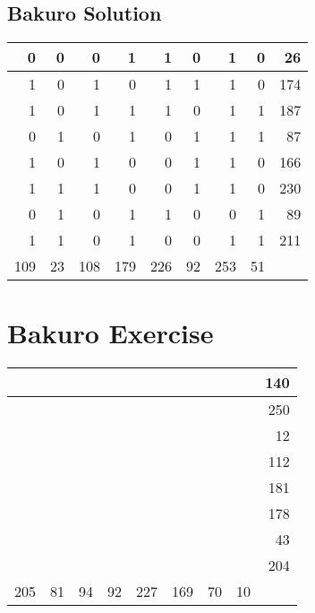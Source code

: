 \documentclass[]{article}
\begin{document}
 \subsection{Bakuro Solution} 
\begin{tabular}{rrrrrrrrr}
\hline
   0 &  0 &   0 &   1 &   1 &  0 &   1 &  0 &  26 \\ \hline
   1 &  0 &   1 &   0 &   1 &  1 &   1 &  0 & 174 \\ \hline
   1 &  0 &   1 &   1 &   1 &  0 &   1 &  1 & 187 \\ \hline
   0 &  1 &   0 &   1 &   0 &  1 &   1 &  1 &  87 \\ \hline
   1 &  0 &   1 &   0 &   0 &  1 &   1 &  0 & 166 \\ \hline
   1 &  1 &   1 &   0 &   0 &  1 &   1 &  0 & 230 \\ \hline
   0 &  1 &   0 &   1 &   1 &  0 &   0 &  1 &  89 \\ \hline
   1 &  1 &   0 &   1 &   0 &  0 &   1 &  1 & 211 \\ \hline
 109 & 23 & 108 & 179 & 226 & 92 & 253 & 51 &     \\ \hline
\hline
\end{tabular}\newpage\section{Bakuro Exercise}\begin{tabular}{rrrrrrrrr}
\hline
     &    &    &    &     &     &    &    & 140 \\ \hline
     &    &    &    &     &     &    &    & 250 \\ \hline
     &    &    &    &     &     &    &    &  12 \\ \hline
     &    &    &    &     &     &    &    & 112 \\ \hline
     &    &    &    &     &     &    &    & 181 \\ \hline
     &    &    &    &     &     &    &    & 178 \\ \hline
     &    &    &    &     &     &    &    &  43 \\ \hline
     &    &    &    &     &     &    &    & 204 \\ \hline
 205 & 81 & 94 & 92 & 227 & 169 & 70 & 10 &     \\ \hline
\hline
\end{tabular}\newpage 
\end{document}

